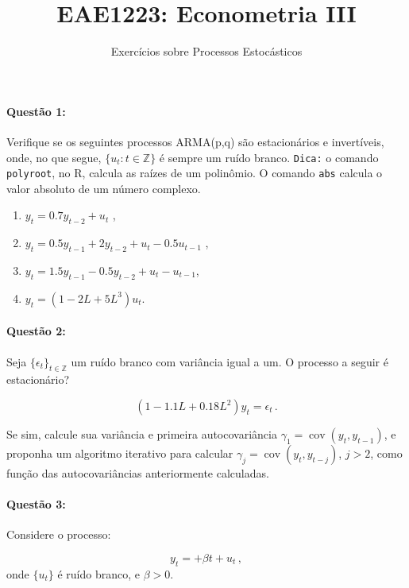 \documentclass[10pt,a4paper]{article}
\title{\large EAE1223: Econometria III}
\author{\normalsize Exercícios sobre Processos Estocásticos}
\date{}
\begin{document}
	\maketitle
	\paragraph{Questão 1:}  Verifique se os seguintes processos ARMA(p,q) são estacionários e invertíveis, onde, no que segue, $\{u_t:t\in \mathbb{Z}\}$ é sempre um ruído branco. \texttt{Dica:} o comando \texttt{polyroot}, no R, calcula as raízes de um polinômio. O comando \texttt{abs} calcula o valor absoluto de um número complexo.
	
	\begin{enumerate}
		\item $y_t = 0.7 y_{t-2} + u_t$  ,
		\item $y_t = 0.5 y_{t-1} + 2y_{t-2} + u_t - 0.5 u_{t-1}$  ,
		\item $y_t = 1.5 y_{t-1}  - 0.5 y_{t-2} + u_t  - u_{t-1}$,
		\item $y_t = (1 - 2 L + 5 L^3)u_t$.
	\end{enumerate}
	
	\paragraph{Questão 2:} Seja $\{\epsilon_t\}_{t\in \mathbb{Z}}$ um ruído branco com variância igual a um. O processo a seguir é estacionário?
	
	$$(1-1.1L + 0.18L^2)y_t = \epsilon_t \, .$$
	
	Se sim, calcule sua variância e primeira autocovariância $\gamma_1 = \operatorname{cov}(y_t, y_{t-1})$, e proponha um algoritmo iterativo para calcular $\gamma_j = \operatorname{cov}(y_t, y_{t-j})$, $j>2$, como função das autocovariâncias anteriormente calculadas.

		\paragraph{Questão 3:} Considere o processo:
		
		$$y_t = + \beta t + u_t \, ,$$
		onde $\{u_t\}$ é ruído branco, e $\beta > 0$.
		
\end{document}
